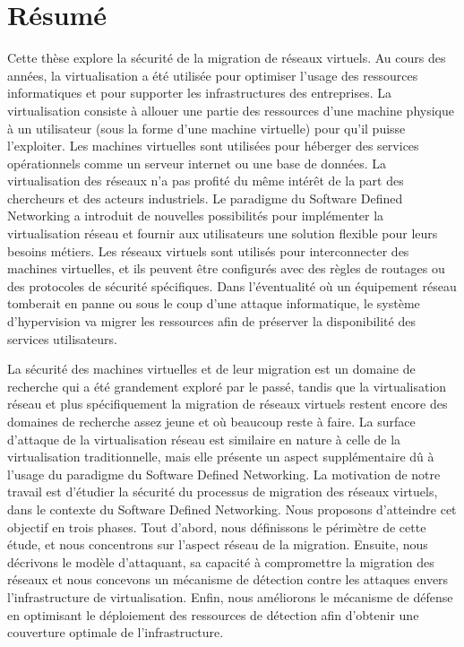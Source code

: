 \documentclass[a4paper, 11pt]{report}
\theoremstyle{definition}
\begin{document}
\chapter*{R\'esum\'e}
Cette th\`{e}se explore la s\'{e}curit\'{e} de la migration de r\'{e}seaux virtuels. Au cours des ann\'{e}es, la virtualisation a \'{e}t\'{e} utilis\'{e}e pour optimiser l'usage des ressources informatiques et pour supporter les infrastructures des entreprises. La virtualisation consiste \`{a} allouer une partie des ressources d'une machine physique \`{a} un utilisateur (sous la forme d'une machine virtuelle) pour qu'il puisse l'exploiter. Les machines virtuelles sont utilis\'{e}es pour h\'{e}berger des services op\'{e}rationnels comme un serveur internet ou une base de donn\'{e}es. La virtualisation des r\'{e}seaux n'a pas profit\'{e} du m\^{e}me int\'{e}r\^{e}t de la part des chercheurs et des acteurs industriels. Le paradigme du Software Defined Networking a introduit de nouvelles possibilit\'{e}s pour impl\'{e}menter la virtualisation r\'{e}seau et fournir aux utilisateurs une solution flexible pour leurs besoins m\'{e}tiers. Les r\'{e}seaux virtuels sont utilis\'{e}s pour interconnecter des machines virtuelles, et ils peuvent \^{e}tre configur\'{e}s avec des r\`{e}gles de routages ou des protocoles de s\'{e}curit\'{e} sp\'{e}cifiques. Dans l'\'{e}ventualit\'{e} o\`{u} un \'{e}quipement r\'{e}seau tomberait en panne ou sous le coup d'une attaque informatique, le syst\`{e}me d'hypervision va migrer les ressources afin de pr\'{e}server la disponibilit\'{e} des services utilisateurs.

La s\'{e}curit\'{e} des machines virtuelles et de leur migration est un domaine de recherche qui a \'{e}t\'{e} grandement explor\'{e} par le pass\'{e}, tandis que la virtualisation r\'{e}seau et plus sp\'{e}cifiquement la migration de r\'{e}seaux virtuels restent encore des domaines de recherche assez jeune et o\`{u} beaucoup reste \`{a} faire. La surface d'attaque de la virtualisation r\'{e}seau est similaire en nature \`{a} celle de la virtualisation traditionnelle, mais elle pr\'{e}sente un aspect suppl\'{e}mentaire d\^{u} \`{a} l'usage du paradigme du Software Defined Networking. La motivation de notre travail est d'\'{e}tudier la s\'{e}curit\'{e} du processus de migration des r\'{e}seaux virtuels, dans le contexte du Software Defined Networking. Nous proposons d'atteindre cet objectif en trois phases. Tout d'abord, nous d\'{e}finissons le p\'{e}rim\`{e}tre de cette \'{e}tude, et nous concentrons sur l'aspect r\'{e}seau de la migration. Ensuite, nous d\'{e}crivons le mod\`{e}le d'attaquant, sa capacité à compromettre la migration des r\'{e}seaux et nous concevons un m\'{e}canisme de d\'{e}tection contre les attaques envers l'infrastructure de virtualisation. Enfin, nous am\'{e}liorons le m\'{e}canisme de d\'{e}fense en optimisant le d\'{e}ploiement des ressources de d\'{e}tection afin d'obtenir une couverture optimale de l'infrastructure. 
\end{document}
